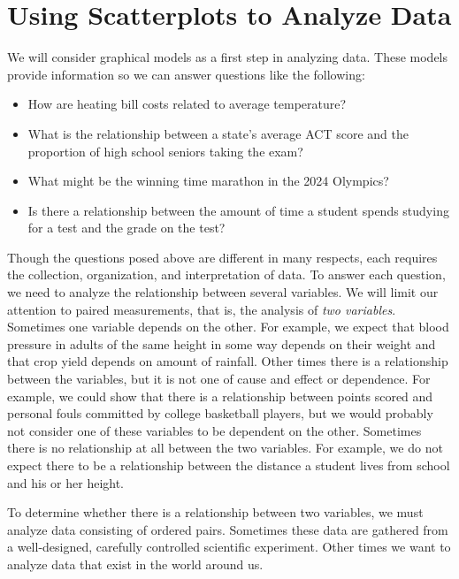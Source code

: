 \documentclass[10pt,]{book}
\theoremstyle{ptxdefinitionnotitle}
\theoremstyle{ptxdefinitiontitle}
\numberwithin{equation}{section}
\begin{document}
\section[{Using Scatterplots to Analyze Data}]{Using Scatterplots to Analyze Data}\label{chapter01-section04}
\hypertarget{p-79}{}%
We will consider graphical models as a first step in analyzing data. These models provide information so we can answer questions like the following: \\ \leavevmode%
\begin{itemize}[label=\textbullet]
\item{}How are heating bill costs related to average temperature?%
\item{}What is the relationship between a state’s average ACT score and the proportion of high school seniors taking the exam?%
\item{}What might be the winning time marathon in the 2024 Olympics?%
\item{}Is there a relationship between the amount of time a student spends studying for a test and the grade on the test? \\%
\end{itemize}
 Though the questions posed above are different in many respects, each requires the collection, organization, and interpretation of data. To answer each question, we need to analyze the relationship between several variables. We will limit our attention to paired measurements, that is, the analysis of \emph{two variables}. Sometimes one variable depends on the other. For example, we expect that blood pressure in adults of the same height in some way depends on their weight and that crop yield depends on amount of rainfall. Other times there is a relationship between the variables, but it is not one of cause and effect or dependence. For example, we could show that there is a relationship between points scored and personal fouls committed by college basketball players, but we would probably not consider one of these variables to be dependent on the other. Sometimes there is no relationship at all between the two variables. For example, we do not expect there to be a relationship between the distance a student lives from school and his or her height. \\%
\par
\hypertarget{p-80}{}%
To determine whether there is a relationship between two variables, we must analyze data consisting of ordered pairs. Sometimes these data are gathered from a well-designed, carefully controlled scientific experiment. Other times we want to analyze data that exist in the world around us. \\%
\end{document}
